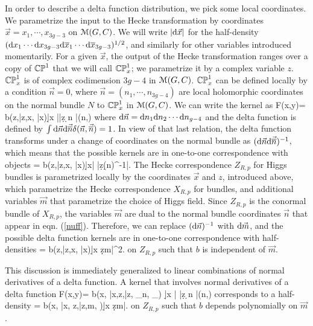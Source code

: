 \documentclass[11pt,a4paper]{article}
\begin{document}
In order to describe a delta function distribution, we  pick some local coordinates. We parametrize the input to the Hecke transformation
by coordinates $\vec x=x_1,\cdots, x_{3g-3}$ on ${\mathcal M}(G,C)$.  We will write $|\mathrm d \vec x|$ for the half-density $(\mathrm d x_1 \cdots \mathrm d x_{3g-3} \mathrm d \overline x_1 
\cdots \mathrm d \overline x_{3g-3})^{1/2}$, and similarly for other variables introduced momentarily.  
For a given $\vec x$,  the output of the Hecke transformation ranges over a copy of ${\mathbb{CP}}^1$ that we will call ${\mathbb{CP}}^1_x$; we parametrize it 
 by a complex variable $z$.  ${\mathbb{CP}}^1_x $ is of complex codimension $3g-4$ in ${\mathcal M}(G,C)$.  ${\mathbb{CP}}^1_x$ can be defined locally by a condition $\vec n=0$, where  $\vec n=(n_1,\cdots, n_{3g-4})$ are local holomorphic coordinates  on the normal bundle $N$  to ${\mathbb{CP}}^1_x$ in ${\mathcal M}(G,C)$. We can write the kernel as 
\be\label{nuff} 
F(x,y)= b(z,\bar z,x, \bar x)|\d\vec x ||\d z \d \vec n |\delta(\vec n,)
\ee
where $\mathrm d \vec n=\mathrm d n_1 \mathrm d n_2\cdots \mathrm d n_{g-4}$ and the delta function is defined by $\int \mathrm d \vec n \mathrm d \vec{ \overline n}\delta(\vec n,\vec{\overline n})=1$. 
In view of that last relation, the delta function transforms under a change of coordinates on the normal bundle as $(\mathrm d \vec n \mathrm d \vec{\overline n})^{-1}$, which
means that the possible kernels are in one-to-one correspondence with objects
\be\label{luff} \mu = b(z,\bar z,x, \bar x)|\d\vec x| |\d z(\d \vec n)^{-1}|. \ee
The Hecke correspondence $Z_{R,p}$ for Higgs bundles is parametrized locally by the coordinates $\vec x$ and $z$, introduced above, which parametrize the Hecke correspondence $X_{R,p}$ for bundles, and additional variables $\vec m$  that parametrize the choice of Higgs field.  Since $Z_{R,p}$ is the conormal bundle of $X_{R,p}$, the variables $\vec m$ are dual to the normal bundle coordinates $\vec n$ that appear in eqn. (\ref{nuff}). 
Therefore, we can replace $(\mathrm d\vec n)^{-1}$ with $\mathrm d \vec m$, and the possible delta function kernels are in one-to-one correspondence with half-densities 
\be\label{luff1} \mu = b(z,\bar z,x, \bar x)|\d\vec x \d z\d \vec m|^2. \ee
on $Z_{R,p}$ such that $b$ is independent of $\vec m$. 

This discussion is immediately generalized to linear combinations of normal derivatives of a delta function.   A kernel that involves normal derivatives of a delta
function
\be\label{nuff2} 
F(x,y)= b(x, \bar x,z,\bar z, \partial_{\vec n}, \partial_{}) |\d\vec x | |\d z \d \vec n |\delta(\vec n,)
\ee
corresponds to a half-density 
\be\label{luff2} \mu = b(x, \bar x, z,\bar z,\vec m, )|\d\vec x \d z\d \vec m|. \ee
on $Z_{R,p}$ such that $b$ depends polynomially on $\vec m$. 
\end{document}
